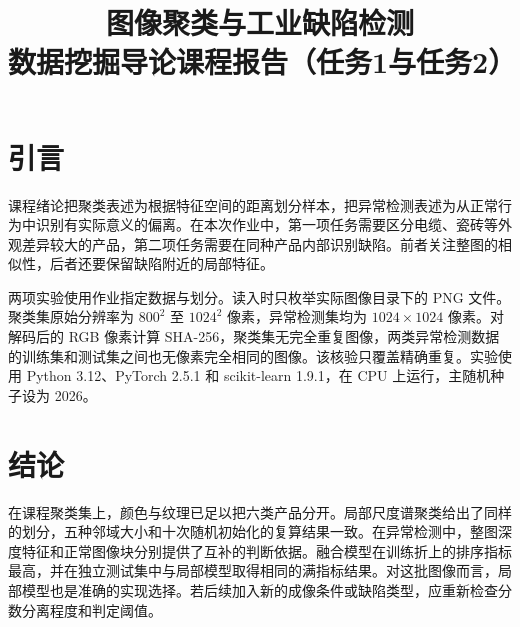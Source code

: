 \documentclass[sigconf,nonacm,screen]{acmart}
\title[图像聚类与工业缺陷检测]{图像聚类与工业缺陷检测\texorpdfstring{\\}{ · }数据挖掘导论课程报告（任务1与任务2）}
\begin{document}
\maketitle

\section{引言}
课程绪论把聚类表述为根据特征空间的距离划分样本，把异常检测表述为从正常行为中识别有实际意义的偏离\cite{courseintro}。在本次作业中，第一项任务需要区分电缆、瓷砖等外观差异较大的产品，第二项任务需要在同种产品内部识别缺陷。前者关注整图的相似性，后者还要保留缺陷附近的局部特征。

两项实验使用作业指定数据与划分。读入时只枚举实际图像目录下的 PNG 文件。聚类集原始分辨率为 $800^2$ 至 $1024^2$ 像素，异常检测集均为 $1024\times1024$ 像素。对解码后的 RGB 像素计算 SHA-256，聚类集无完全重复图像，两类异常检测数据的训练集和测试集之间也无像素完全相同的图像。该核验只覆盖精确重复。实验使用 Python 3.12、PyTorch 2.5.1 和 scikit-learn 1.9.1，在 CPU 上运行，主随机种子设为 2026。




\section{结论}
在课程聚类集上，颜色与纹理已足以把六类产品分开。局部尺度谱聚类给出了同样的划分，五种邻域大小和十次随机初始化的复算结果一致。在异常检测中，整图深度特征和正常图像块分别提供了互补的判断依据。融合模型在训练折上的排序指标最高，并在独立测试集中与局部模型取得相同的满指标结果。对这批图像而言，局部模型也是准确的实现选择。若后续加入新的成像条件或缺陷类型，应重新检查分数分离程度和判定阈值。



\end{document}
